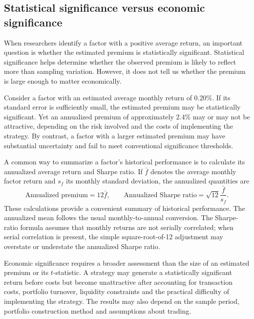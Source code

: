 \subsection{Statistical significance versus economic significance}
\label{subsec:03-statistical-economic-significance}

When researchers identify a factor with a positive average return, an important question is whether the estimated premium is statistically significant. Statistical significance helps determine whether the observed premium is likely to reflect more than sampling variation. However, it does not tell us whether the premium is large enough to matter economically.

Consider a factor with an estimated average monthly return of 0.20\%. If its standard error is sufficiently small, the estimated premium may be statistically significant. Yet an annualized premium of approximately 2.4\% may or may not be attractive, depending on the risk involved and the costs of implementing the strategy. By contrast, a factor with a larger estimated premium may have substantial uncertainty and fail to meet conventional significance thresholds.

A common way to summarize a factor's historical performance is to calculate its annualized average return and Sharpe ratio. If $\bar{f}$ denotes the average monthly factor return and $s_f$ its monthly standard deviation, the annualized quantities are
\begin{equation}
  \text{Annualized premium}=12\bar{f},
  \qquad
  \text{Annualized Sharpe ratio}
  =\sqrt{12}\frac{\bar{f}}{s_f}.
  \label{eq:03-factor-sharpe}
\end{equation}
These calculations provide a convenient summary of historical performance. The annualized mean follows the usual monthly-to-annual conversion. The Sharpe-ratio formula assumes that monthly returns are not serially correlated; when serial correlation is present, the simple square-root-of-12 adjustment may overstate or understate the annualized Sharpe ratio.

Economic significance requires a broader assessment than the size of an estimated premium or its $t$-statistic. A strategy may generate a statistically significant return before costs but become unattractive after accounting for transaction costs, portfolio turnover, liquidity constraints and the practical difficulty of implementing the strategy. The results may also depend on the sample period, portfolio construction method and assumptions about trading.

